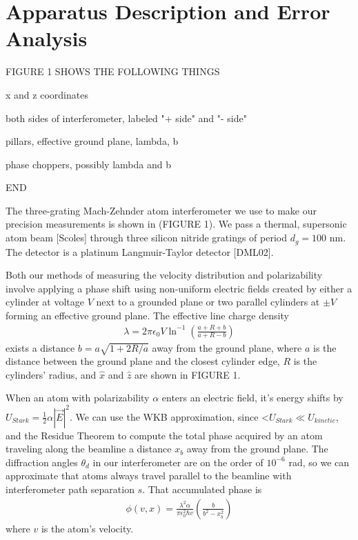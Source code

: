 \documentclass[12pt,letterpaper]{article}
\newcommand{\abs}[1]{\left|#1\right|}
\begin{document}
\section{Apparatus Description and Error Analysis}

FIGURE 1 SHOWS THE FOLLOWING THINGS

x and z coordinates

both sides of interferometer, labeled "+ side" and "- side"

pillars, effective ground plane, lambda, b

phase choppers, possibly lambda and b

END


The three-grating Mach-Zehnder atom interferometer we use to make our precision measurements is shown in (FIGURE 1). We pass a thermal, supersonic atom beam [Scoles] through three silicon nitride gratings of period $d_g = 100$ nm. The detector is a platinum Langmuir-Taylor detector [DML02].

Both our methods of measuring the velocity distribution and polarizability involve applying a phase shift using non-uniform electric fields created by either a cylinder at voltage $V$ next to a grounded plane or two parallel cylinders at $\pm V$ forming an effective ground plane. The effective line charge density
\begin{align}
	\lambda = 2\pi\epsilon_0V\ln^{-1}
	\left(
		\frac{a+R+b}{a+R-b}
	\right)
	\label{lambda}
\end{align}
exists a distance $b = a\sqrt{1+2R/a}$ away from the ground plane, where $a$ is the distance between the ground plane and the closest cylinder edge, $R$ is the cylinders' radius, and $\hat{x}$ and $\hat{z}$ are shown in FIGURE 1.

\begin{comment}
That electric field is 
\begin{align}
	\vec{E} = \frac{\lambda}{\pi\epsilon_0}
	\left[	
		\frac{x-b}{(x-b)^2+z^2} - \frac{x+b}{(x+b)^2+z^2}
	\right] \hat{x} \nonumber \\
	+ 
	\left[	
		\frac{z}{(x-b)^2+z^2} - \frac{z}{(x+b)^2+z^2}
	\right] \hat{z}
	\label{EPillars}
\end{align}
\end{comment}


When an atom with polarizability $\alpha$ enters an electric field, it's energy shifts by $U_{Stark} = \frac{1}{2}\alpha\abs{\vec{E}}^2$. We can use the WKB approximation, since <$U_{Stark} \ll U_{kinetic}$, and the Residue Theorem to compute the total phase acquired by an atom traveling along the beamline a distance $x_b$ away from the ground plane.
The diffraction angles $\theta_d$ in our interferometer are on the order of $10^{-6}$ rad, so we can approximate that atoms always travel parallel to the beamline with interferometer path separation $s$. That accumulated phase is
\begin{align}
	\phi(v,x) = \frac{\lambda^2 \alpha}{\pi \epsilon_0^2 \hbar v}
	\left( \frac{b}{b^2-x_b^2} \right)
	\label{accumPhasePillars}
\end{align}
where $v$ is the atom's velocity.
\end{document}
